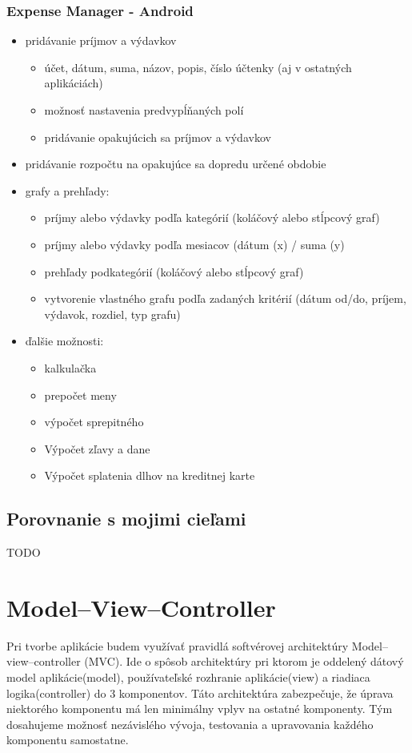 \documentclass[12pt]{book}
\begin{document}
\subsubsection{Expense Manager - Android \cite{ExpenseManager}\ }
\begin{itemize}
\item{pridávanie príjmov a výdavkov}
\begin{itemize}
\item{účet, dátum, suma, názov, popis, číslo účtenky (aj v ostatných aplikáciách)}
\item{možnosť nastavenia predvypĺňaných polí}
\item{pridávanie opakujúcich sa príjmov a výdavkov}
\end{itemize}
\item{pridávanie rozpočtu na opakujúce sa dopredu určené obdobie}
\item{grafy a prehľady:}
\begin{itemize}
\item{príjmy alebo výdavky podľa kategórií (koláčový alebo stĺpcový graf)}
\item{príjmy alebo výdavky podľa mesiacov (dátum (x) / suma (y)}
\item{prehľady podkategórií (koláčový alebo stĺpcový graf)}
\item{vytvorenie vlastného grafu podľa zadaných kritérií (dátum od/do, príjem, výdavok, rozdiel, typ grafu)}
\end{itemize}
\item{ďalšie možnosti:}
\begin{itemize}
\item{kalkulačka}
\item{prepočet meny}
\item{výpočet sprepitného}
\item{Výpočet zľavy a dane}
\item{Výpočet splatenia dlhov na kreditnej karte}
\end{itemize}
\end{itemize}

\subsection{Porovnanie s mojimi cieľami}
TODO


\section{Model–View–Controller}
Pri tvorbe aplikácie budem využívať pravidlá softvérovej architektúry Model–view–controller (MVC). Ide o spôsob architektúry pri ktorom je oddelený dátový model aplikácie(model), používateľské rozhranie aplikácie(view) a riadiaca logika(controller) do 3 komponentov. Táto architektúra zabezpečuje, že úprava niektorého komponentu má len minimálny vplyv na ostatné komponenty. Tým dosahujeme možnosť nezávislého vývoja, testovania a upravovania každého komponentu samostatne.
\end{document}
